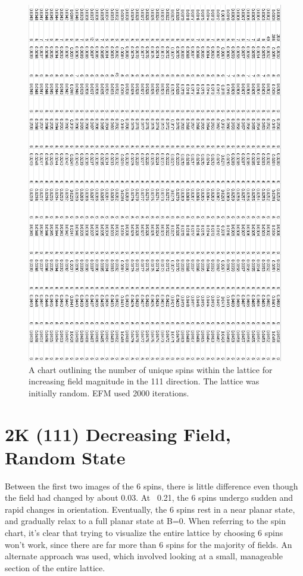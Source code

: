 \documentclass{article}
\begin{document}
\begin{figure}[ht]
\centering
 \includegraphics[keepaspectratio,scale=0.52]{111_2000/000to005RSpinChart.png}
   \caption{A chart outlining the number of unique spins within the lattice for increasing field magnitude in the 111
   direction. The lattice was initially random. EFM used 2000 iterations.}
   \end{figure}

  \clearpage
\section{2K (111) Decreasing Field, Random State}
Between the first two images of the 6 spins, there is little difference even though the field had
changed by about 0.03. At ~0.21, the 6 spins undergo sudden and rapid changes in orientation. Eventually,
the 6 spins rest in a near planar state, and gradually relax to a full planar state at B=0. When 
referring to the spin chart, it's clear that trying to visualize the entire lattice by choosing 6
spins won't work, since there are far more than 6 spins for the majority of fields. 
An alternate approach was used, which involved looking at a small, manageable section of the entire 
lattice. 
\end{document}
